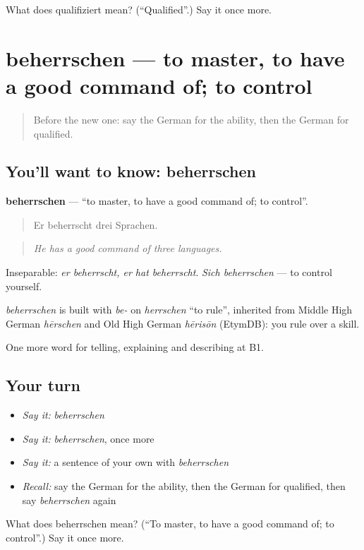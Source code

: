 \begin{tcolorbox}[breakable,colback=teal!4,colframe=teal!35!black,title={Before you move on}]
What does qualifiziert mean? (\textquotedblleft{}Qualified\textquotedblright{}.) Say it once more.
\end{tcolorbox}
\section[beherrschen]{beherrschen — to master, to have a good command of; to control}

\label{lesson:GE-C349-beherrschen}



\begin{quote}
Before the new one: say the German for the ability, then the German for qualified.
\end{quote}

\subsection*{You'll want to know: beherrschen}
\textbf{beherrschen} — \textquotedblleft{}to master, to have a good command of; to control\textquotedblright{}.

\begin{quote}
Er beherrscht drei Sprachen.
\end{quote}

\begin{quote}
\emph{He has a good command of three languages.}
\end{quote}

Inseparable: \emph{er beherrscht, er hat beherrscht}. \emph{Sich beherrschen} — to control yourself.

\begin{cousinweb}
\emph{beherrschen} is built with \emph{be-} on \emph{herrschen} \textquotedblleft{}to rule\textquotedblright{}, inherited from Middle High German \emph{hērschen} and Old High German \emph{hērisōn} (EtymDB): you rule over a skill.
\end{cousinweb}

\begin{grammarlens}[title={What you've built}]
One more word for telling, explaining and describing at B1.
\end{grammarlens}

\subsection*{Your turn}
\begin{itemize}
\raggedright
  \item \emph{Say it:} \emph{beherrschen}
  \item \emph{Say it:} \emph{beherrschen}, once more
  \item \emph{Say it:} a sentence of your own with \emph{beherrschen}
  \item \emph{Recall:} say the German for the ability, then the German for qualified, then say \emph{beherrschen} again
\end{itemize}

\begin{tcolorbox}[breakable,colback=teal!4,colframe=teal!35!black,title={Before you move on}]
What does beherrschen mean? (\textquotedblleft{}To master, to have a good command of; to control\textquotedblright{}.) Say it once more.
\end{tcolorbox}
